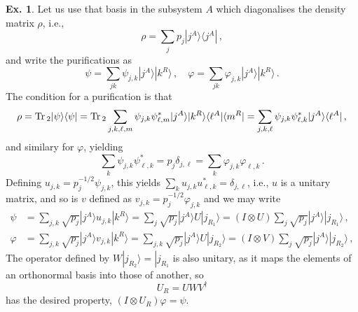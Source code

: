 \documentclass[a4paper,12pt]{article}
\def\Tr{\ensuremath{\mathop{\rm Tr}}{}}
\theoremstyle{definition}
\newtheorem{exercise}{Ex.}[section]
\begin{document}
\begin{exercise}
 Let us use that basis in the subsystem $A$ which diagonalises the density matrix $\rho$, i.e.,
 \[
  \rho = \sum_j p_j |j^A\rangle \langle j^A|\,,
 \]
 and write the purifications as
 \[
  \psi = \sum_{jk}\psi_{j,k}|j^A\rangle |k^R\rangle\,,\quad \varphi = \sum_{jk}\varphi_{j,k}|j^A\rangle |k^R\rangle\,.
 \]
 The condition for a purification is that
 \[
  \rho = \Tr_2 |\psi\rangle\langle\psi | = \Tr_2 \sum_{j,k,\ell,m} \psi_{j,k}\psi_{\ell, m}^* |j^A\rangle|k^R\rangle\langle \ell^A|\langle m^R| = \sum_{j,k,\ell} \psi_{j,k}\psi_{\ell,k}^* |j^A\rangle \langle \ell^A|\,,
 \]
 and similary for $\varphi$, yielding
 \[
  \sum_k \psi_{j,k} \psi_{\ell, k}^* = p_j \delta_{j, \ell} = \sum_k \varphi_{j,k } \varphi_{\ell, k}\,.
 \]
 Defining $u_{j,k} = p_j^{-1/2} \psi_{j, k}$, this yields $\sum_k u_{j, k} u_{\ell, k}^* = \delta_{j, \ell}$, i.e., $u$ is a unitary matrix, and so is $v$ defined as $v_{j, k} = p_j^{-1/2} \varphi_{j, k}$ and we may write
 \[
  \begin{aligned}
   \psi &= \sum_{j,k} \sqrt{p_j}|j^A\rangle u_{j, k}|k^R\rangle  =\sum_j\sqrt{p_j}|j^A\rangle U|j_{R_1}\rangle = (I\otimes U)\sum_j \sqrt{p_j}|j^A\rangle|j_{R_1}\rangle\,,\\
   \varphi &= \sum_{j,k} \sqrt{p_j}|j^A\rangle v_{j, k}|k^R\rangle=\sum_{j,k}\sqrt{p_j}|j^A\rangle U|j_{R_2}\rangle= (I\otimes V)\sum_j \sqrt{p_j}|j^A\rangle|j_{R_2}\rangle\,,
  \end{aligned}
 \]
 The operator defined by $W|j_{R_2}\rangle = |j_{R_1}$ is also unitary, as it maps the elements of an orthonormal basis into those of another, so
 \[
  U_{R} = U W V^\dagger
 \]
 has the desired property, $(I\otimes U_R)\varphi = \psi$.
\end{exercise}
\end{document}
